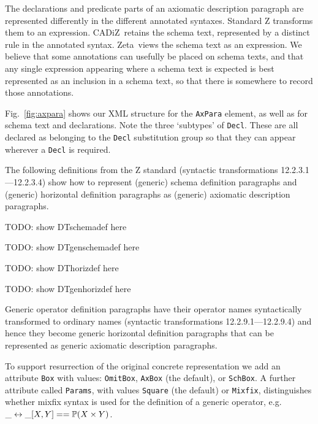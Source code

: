 \documentclass{llncs}  %
\newcommand{\AFont}[1]{\texttt{#1}}
\newcommand{\CADiZ}{CADiZ}
\newcommand{\Zeta}{Zeta}
\newcommand{\DTschemadef}{\par TODO: show DTschemadef here \par}
\newcommand{\DTgenschemadef}{\par TODO: show DTgenschemadef here \par}
\newcommand{\DThorizdef}{\par TODO: show DThorizdef here \par}
\newcommand{\DTgenhorizdef}{\par TODO: show DTgenhorizdef here \par}
\begin{document}
The declarations and predicate parts of an axiomatic description paragraph
are represented differently in the different annotated syntaxes.
Standard Z transforms them to an expression.
\CADiZ\ retains the schema text,
represented by a distinct rule in the annotated syntax.
\Zeta\ views the schema text as an expression.
We believe that some annotations can usefully be placed on schema texts,
and that any single expression appearing where a schema text is expected
is best represented as an inclusion in a schema text,
so that there is somewhere to record those annotations.

Fig.~\ref{fig:axpara} shows our XML structure for the \AFont{AxPara}
element, as well as for schema text and declarations.  Note the
three `subtypes' of \AFont{Decl}.  These are all declared as belonging to
the \AFont{Decl} substitution group so that they can appear wherever
a \AFont{Decl} is required.

The following definitions from the Z standard
(syntactic transformations 12.2.3.1---12.2.3.4)
show how to represent (generic) schema definition paragraphs
and (generic) horizontal definition paragraphs
as (generic) axiomatic description paragraphs.
\DTschemadef
\DTgenschemadef
\DThorizdef
\DTgenhorizdef
Generic operator definition paragraphs have their operator names
syntactically transformed to ordinary names
(syntactic transformations 12.2.9.1---12.2.9.4)
and hence they become generic horizontal definition paragraphs
that can be represented as generic axiomatic description paragraphs.

To support resurrection of the original concrete representation we add an
attribute \AFont{Box} with values: \AFont{OmitBox}, \AFont{AxBox} (the
default), or \AFont{SchBox}.  A further attribute called \AFont{Params},
with values \AFont{Square} (the default) or \AFont{Mixfix}, distinguishes
whether mixfix syntax is used for the definition of a generic operator,
e.g. $\_ \rel \_ [X,Y] == \power(X \cross Y)$.
\end{document}
